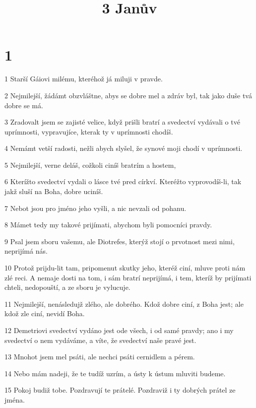 

\title{3 Janův}

\chapter{1}

\par 1 Starší Gáiovi milému, kteréhož já miluji v pravde.
\par 2 Nejmilejší, žádámt obzvláštne, abys se dobre mel a zdráv byl, tak jako duše tvá dobre se má.
\par 3 Zradovalt jsem se zajisté velice, když prišli bratrí a svedectví vydávali o tvé uprímnosti, vypravujíce, kterak ty v uprímnosti chodíš.
\par 4 Nemámt vetší radosti, nežli abych slyšel, že synové moji chodí v uprímnosti.
\par 5 Nejmilejší, verne deláš, cožkoli ciníš bratrím a hostem,
\par 6 Kterížto svedectví vydali o lásce tvé pred církví. Kteréžto vyprovodíš-li, tak jakž sluší na Boha, dobre uciníš.
\par 7 Nebot jsou pro jméno jeho vyšli, a nic nevzali od pohanu.
\par 8 Mámet tedy my takové prijímati, abychom byli pomocníci pravdy.
\par 9 Psal jsem sboru vašemu, ale Diotrefes, kterýž stojí o prvotnost mezi nimi, neprijímá nás.
\par 10 Protož prijdu-lit tam, pripomenut skutky jeho, kteréž ciní, mluve proti nám zlé reci. A nemaje dosti na tom, i sám bratrí neprijímá, i tem, kteríž by prijímati chteli, nedopouští, a ze sboru je vylucuje.
\par 11 Nejmilejší, nenásledujž zlého, ale dobrého. Kdož dobre ciní, z Boha jest; ale kdož zle ciní, nevidí Boha.
\par 12 Demetriovi svedectví vydáno jest ode všech, i od samé pravdy; ano i my svedectví o nem vydáváme, a víte, že svedectví naše pravé jest.
\par 13 Mnohot jsem mel psáti, ale nechci psáti cernidlem a pérem.
\par 14 Nebo mám nadeji, že te tudíž uzrím, a ústy k ústum mluviti budeme.
\par 15 Pokoj budiž tobe. Pozdravují te prátelé. Pozdraviž i ty dobrých prátel ze jména.


